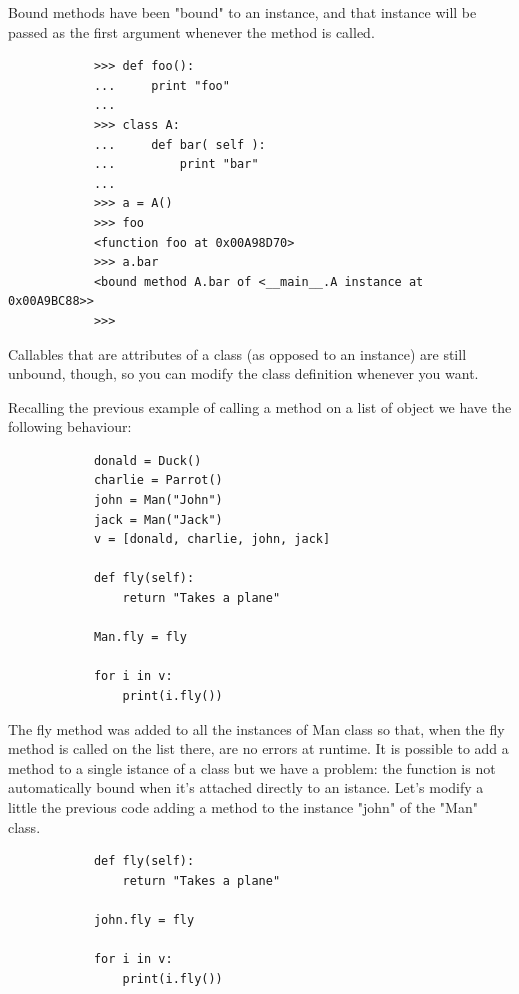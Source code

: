 \documentclass[12pt]{article}
\begin{document}
		Bound methods have been "bound" to an instance, and that instance will be passed as the first argument whenever the method is called.
		
		\begin{lstlisting}
			>>> def foo():
			...     print "foo"
			...
			>>> class A:
			...     def bar( self ):
			...         print "bar"
			...
			>>> a = A()
			>>> foo
			<function foo at 0x00A98D70>
			>>> a.bar
			<bound method A.bar of <__main__.A instance at 0x00A9BC88>>
			>>>
		\end{lstlisting}
		Callables that are attributes of a class (as opposed to an instance) are still unbound, though, so you can modify the class definition whenever you want.
		
			
		
		Recalling the previous example of calling a method on a list of object we have the following behaviour:
		
		\begin{lstlisting}
			donald = Duck()
			charlie = Parrot()
			john = Man("John")
			jack = Man("Jack")
			v = [donald, charlie, john, jack]
			
			def fly(self):
				return "Takes a plane"
			
			Man.fly = fly
			
			for i in v:
				print(i.fly())
		\end{lstlisting}
		
		The fly method was added to all the instances of Man class so that, when the fly method is called on the list there, are no errors at runtime. It is possible to add a method to a single istance of a class but we have a problem: the function is not automatically bound when it's attached directly to an istance. Let's modify a little the previous code adding a method to the instance "john" of the "Man" class.
		 
		\begin{lstlisting}
			def fly(self):
				return "Takes a plane"
			
			john.fly = fly
			
			for i in v:
				print(i.fly())
		\end{lstlisting}
		
\end{document}
